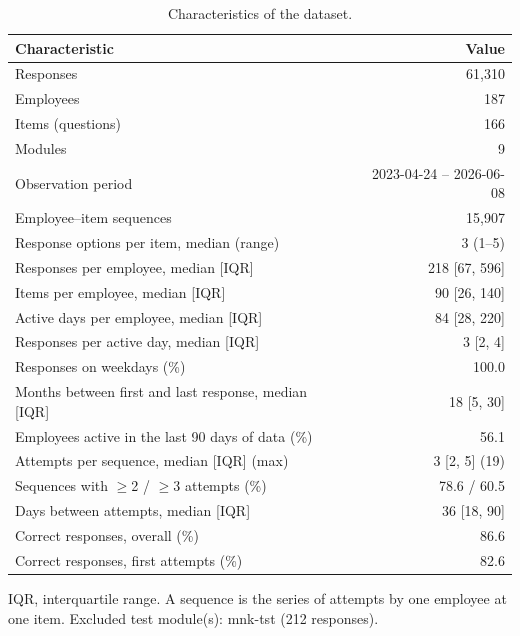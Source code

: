 \begin{table}[htbp]
\centering
\caption{Characteristics of the dataset.}
\label{tab:dataset}
\small
\begin{tabular}{lr}
\toprule
Characteristic & Value \\
\midrule
Responses & 61,310 \\
Employees & 187 \\
Items (questions) & 166 \\
Modules & 9 \\
Observation period & 2023-04-24 -- 2026-06-08 \\
Employee--item sequences & 15,907 \\
Response options per item, median (range) & 3 (1--5) \\
\midrule
Responses per employee, median [IQR] & 218 [67, 596] \\
Items per employee, median [IQR] & 90 [26, 140] \\
Active days per employee, median [IQR] & 84 [28, 220] \\
Responses per active day, median [IQR] & 3 [2, 4] \\
Responses on weekdays (\%) & 100.0 \\
Months between first and last response, median [IQR] & 18 [5, 30] \\
Employees active in the last 90 days of data (\%) & 56.1 \\
\midrule
Attempts per sequence, median [IQR] (max) & 3 [2, 5] (19) \\
Sequences with $\geq$2 / $\geq$3 attempts (\%) & 78.6 / 60.5 \\
Days between attempts, median [IQR] & 36 [18, 90] \\
\midrule
Correct responses, overall (\%) & 86.6 \\
Correct responses, first attempts (\%) & 82.6 \\
\bottomrule
\end{tabular}

\vspace{2pt}
\parbox{\linewidth}{\footnotesize IQR, interquartile range. A sequence is the series of attempts by one employee at one item. Excluded test module(s): mnk-tst (212 responses).}
\end{table}
